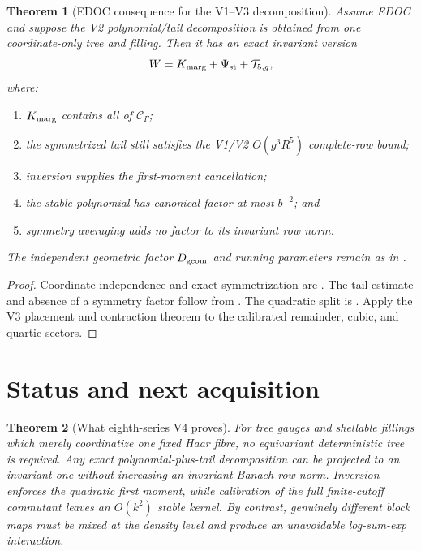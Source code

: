 \documentclass[11pt,oneside]{book}
\newtheorem{theorem}{Theorem}[chapter]
\theoremstyle{definition}
\theoremstyle{remark}
\begin{document}
\begin{theorem}[EDOC consequence for the V1--V3 decomposition]
\label{thm:e8v4-card}
Assume EDOC and suppose the V2 polynomial/tail decomposition is
obtained from one coordinate-only tree and filling.  Then it has an
exact invariant version
\[
 W=K_{\rm marg}+\Psi_{\rm st}+{\cal T}_{5,g},         \label{eq:e8v4-final}
\]
where:
\begin{enumerate}[label=\textup{(\roman*)},leftmargin=3.5em]
\item \(K_{\rm marg}\) contains all of
      \({\mathcal C}_\Gamma\);
\item the symmetrized tail still satisfies the V1/V2
      \(O(g^3R^5)\) complete-row bound;
\item inversion supplies the first-moment cancellation;
\item the stable polynomial has canonical factor at most \(b^{-2}\);
      and
\item symmetry averaging adds no factor to its invariant row norm.
\end{enumerate}
The independent geometric factor \(D_{\rm geom}\) and running
parameters remain as in .
\end{theorem}

\begin{proof}
Coordinate independence and exact symmetrization are
.  The tail estimate
and absence of a symmetry factor follow from
.  The quadratic split is
.  Apply the V3 placement and
contraction theorem to the calibrated remainder, cubic, and quartic
sectors.
\end{proof}

\section{Status and next acquisition}
\label{sec:e8v4-status}

\begin{theorem}[What eighth-series V4 proves]
\label{thm:e8v4-result}
For tree gauges and shellable fillings which merely coordinatize one
fixed Haar fibre, no equivariant deterministic tree is required.
Any exact polynomial-plus-tail decomposition can be projected to an
invariant one without increasing an invariant Banach row norm.
Inversion enforces the quadratic first moment, while calibration of
the full finite-cutoff commutant leaves an \(O(k^2)\) stable kernel.
By contrast, genuinely different block maps must be mixed at the
density level and produce an unavoidable log-sum-exp interaction.
\end{theorem}
\end{document}
